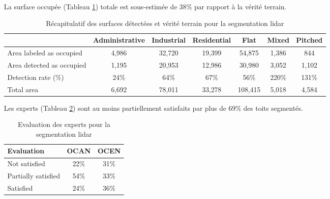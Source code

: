 \par{La surface occupée (Tableau \ref{tab:stdl_04_resultats_segmentation_lidar_affectation}) totale est sous-estimée de 38\% par rapport à la vérité terrain.}

\begin{table}[H]
    \centering
    \begin{tabular}{|p{2.7cm}|c|c|c|c|c|c|}
    \hline
    & Administrative & Industrial & Residential & Flat & Mixed & Pitched \\
    \hline
    Area labeled as occupied & 4,986 & 32,720 & 19,399 & 54,875 & 1,386 & 844 \\
    Area detected as occupied & 1,195 & 20,953 & 12,986 & 30,980 & 3,052 & 1,102 \\
    Detection rate (\%) & 24\% & 64\% & 67\% & 56\% & 220\% & 131\% \\
    Total area & 6,692 & 78,011 & 33,278 & 108,415 & 5,018 & 4,584 \\
    \hline
    \end{tabular}
    \caption{Récapitulatif des surfaces détectées et vérité terrain pour la segmentation \gls{lidar}}
    \label{tab:stdl_04_resultats_segmentation_lidar_affectation}
\end{table}


\newpage
\par{Les experts (Tableau \ref{tab:stdl_05_resultats_segmentation_lidar_experts}) sont au moins partiellement satisfaits par plus de 69\% des toits segmentés.}

\begin{table}[H]
    \centering
    \begin{tabular}{|l|c|c|}
    \hline
    Evaluation & OCAN & OCEN \\
    \hline
    Not satisfied & 22\% & 31\% \\
    Partially satisfied & 54\% & 33\% \\
    Satisfied & 24\% & 36\% \\
    \hline
    \end{tabular}
    \caption{Evaluation des experts pour la segmentation \gls{lidar}}
    \label{tab:stdl_05_resultats_segmentation_lidar_experts}
\end{table}


